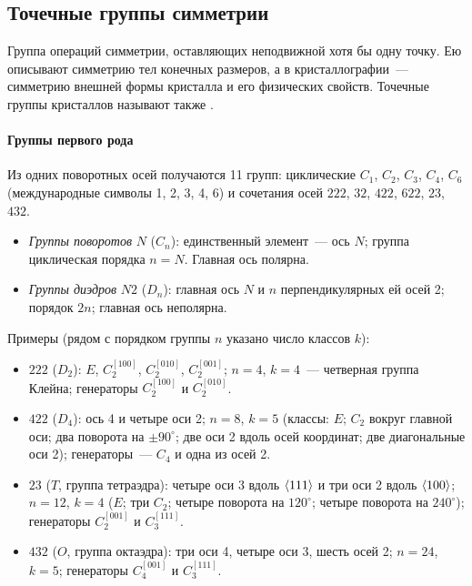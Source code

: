 \subsection{Точечные группы симметрии}\label{ssec:point-groups}

\begin{opredelenie}
Группа операций симметрии, оставляющих неподвижной хотя бы одну точку.
Ею описывают симметрию тел конечных размеров, а в кристаллографии~—
симметрию внешней формы кристалла и его физических свойств. Точечные
группы кристаллов называют также .
\end{opredelenie}

\paragraph{Группы первого рода}
Из одних поворотных осей получаются 11 групп: циклические $C_1$, $C_2$,
$C_3$, $C_4$, $C_6$ (международные символы 1, 2, 3, 4, 6) и сочетания осей
$222$, $32$, $422$, $622$, $23$, $432$.
\begin{itemize}
\item \emph{Группы поворотов} $N$ ($C_n$): единственный элемент~— ось $N$;
группа циклическая порядка $n=N$. Главная ось полярна.
\item \emph{Группы диэдров} $N2$ ($D_n$): главная ось $N$ и $n$
перпендикулярных ей осей 2; порядок $2n$; главная ось неполярна.
\end{itemize}

Примеры (рядом с порядком группы $n$ указано число классов $k$):
\begin{itemize}
\item $222$ ($D_2$): $E$, $C_2^{[100]}$, $C_2^{[010]}$, $C_2^{[001]}$; $n=4$, $k=4$~—
четверная группа Клейна; генераторы $C_2^{[100]}$ и $C_2^{[010]}$.
\item $422$ ($D_4$): ось 4 и четыре оси 2; $n=8$, $k=5$ (классы: $E$; $C_2$ вокруг
главной оси; два поворота на $\pm90^\circ$; две оси 2 вдоль осей координат;
две диагональные оси 2); генераторы~— $C_4$
и одна из осей 2.
\item $23$ ($T$, группа тетраэдра): четыре оси 3 вдоль $\langle 111\rangle$ и три оси 2
вдоль $\langle 100\rangle$; $n=12$, $k=4$ ($E$; три $C_2$; четыре поворота на $120^\circ$;
четыре поворота на $240^\circ$); генераторы
$C_2^{[001]}$ и $C_3^{[111]}$.
\item $432$ ($O$, группа октаэдра): три оси 4, четыре оси 3, шесть осей 2;
$n=24$, $k=5$; генераторы $C_4^{[001]}$ и $C_3^{[111]}$.
\end{itemize}

